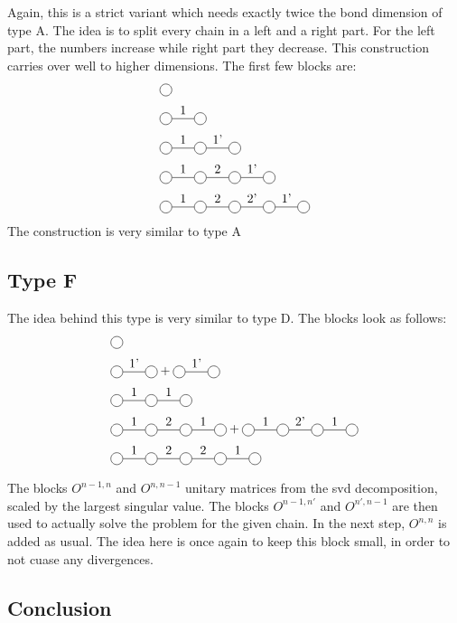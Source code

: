 Again, this is a strict variant which needs exactly twice the bond dimension of type A. The idea is to split every chain in a left and a right part. For the left part, the numbers increase while right part they decrease. This construction carries over well to higher dimensions. The first few blocks are:
\begin{equation}
    \begin{split}
        &\mpob{1}{ {,}  }{}{}{}{{,,}} \\
        &\mpob{2}{ {,"1",}  }{}{}{}{{,,}}\\
        &\mpob{3}{ {,"1","1'",}  }{}{}{}{{,,,}}\\
        &\mpob{4}{ {,"1","2","1'",}  }{}{}{}{{,,,,,}}\\
        &\mpob{5}{ {,"1","2","2'","1'",}  }{}{}{}{{,,,,,}}\\
    \end{split}
\end{equation}
The construction is very similar to type A

\subsection{Type F}

The idea behind this type is very similar to type D. The blocks look as follows:
\begin{equation}
    \begin{split}
        &\mpob{1}{ {,}  }{}{}{}{{,,}} \\
        &\mpob{2}{ {,"1'",}  }{}{}{}{{,,}}+\mpob{2}{ {,"1'",}  }{}{}{}{{,,}}\\
        &\mpob{3}{ {,"1","1",}  }{}{}{}{{,,,}}\\
        &\mpob{4}{ {,"1","2","1",}  }{}{}{}{{,,,,,}}+\mpob{4}{ {,"1","2'","1",}  }{}{}{}{{,,,,,}}\\
        &\mpob{5}{ {,"1","2","2","1",}  }{}{}{}{{,,,,,}}\\
    \end{split}
\end{equation}

The  blocks $O^{n-1,n}$ and $O^{n,n-1}$ unitary matrices from the svd decomposition, scaled by the largest singular value. The blocks $O^{n-1,n'}$ and $O^{n',n-1}$ are then used to actually solve the problem for the given chain. In the next step, $O^{n,n}$ is added as usual. The idea here is once again to keep this block small, in order to not cuase any divergences.

\subsection{Conclusion}

